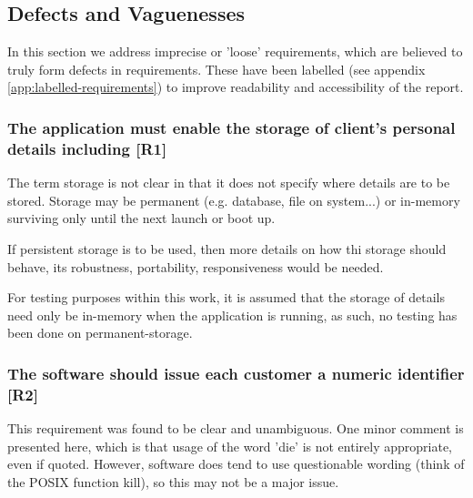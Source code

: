 
\subsection{Defects and Vaguenesses}
\label{sec:defects-and-vaguenesses}
In this section we address imprecise or 'loose' requirements, which are believed to truly form defects in requirements.
These have been labelled (see appendix \ref{app:labelled-requirements}) to improve readability and accessibility of the report.

\subsubsection{The application must enable the storage of client’s personal details including [R1]}
The term storage is not clear in that it does not specify where details are to be stored. 
Storage may be permanent (e.g. database, file on system...) or in-memory surviving only until the next launch or boot up. 
\par
If persistent storage is to be used, then more details on how thi storage should behave, its robustness, portability, responsiveness would be needed. 
\par
For testing purposes within this work, it is assumed that the storage of details need only be in-memory when the application is running, as such, no testing has been done on permanent-storage.

\subsubsection{The software should issue each customer a numeric identifier [R2]}
This requirement was found to be clear and unambiguous. 
One minor comment is presented here, which is that usage of the word 'die' is not entirely appropriate, even if quoted. However, software does tend to use questionable wording (think of the POSIX function kill), so this may not be a major issue.  

